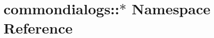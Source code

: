 \hypertarget{namespacecommondialogs_1_1_5}{
\section{commondialogs::$\ast$ Namespace Reference}
\label{namespacecommondialogs_1_1_5}
}


